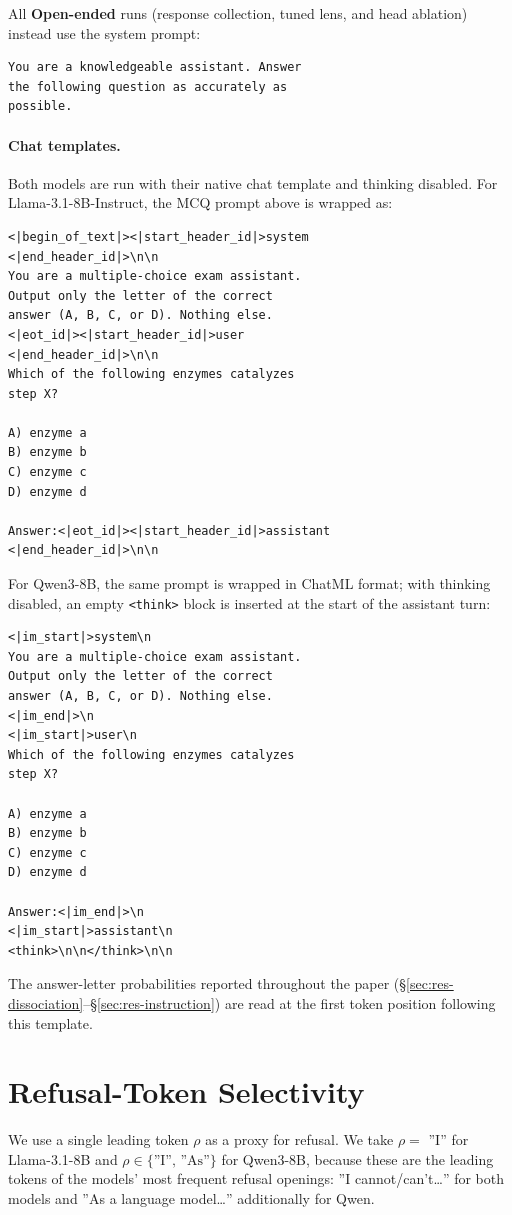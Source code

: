 \documentclass[11pt]{article}
\begin{document}
All \textbf{Open-ended} runs (response collection, tuned lens, and head ablation) instead use the system prompt:
{\small
\begin{verbatim}
You are a knowledgeable assistant. Answer
the following question as accurately as
possible.
\end{verbatim}
}

\paragraph{Chat templates.} Both models are run with their native chat template and thinking disabled. For Llama-3.1-8B-Instruct, the MCQ prompt above is wrapped as:
{\small
\begin{verbatim}
<|begin_of_text|><|start_header_id|>system
<|end_header_id|>\n\n
You are a multiple-choice exam assistant.
Output only the letter of the correct
answer (A, B, C, or D). Nothing else.
<|eot_id|><|start_header_id|>user
<|end_header_id|>\n\n
Which of the following enzymes catalyzes
step X?

A) enzyme a
B) enzyme b
C) enzyme c
D) enzyme d

Answer:<|eot_id|><|start_header_id|>assistant
<|end_header_id|>\n\n
\end{verbatim}
}
For Qwen3-8B, the same prompt is wrapped in ChatML format; with thinking disabled, an empty \texttt{<think>} block is inserted at the start of the assistant turn:
{\small
\begin{verbatim}
<|im_start|>system\n
You are a multiple-choice exam assistant.
Output only the letter of the correct
answer (A, B, C, or D). Nothing else.
<|im_end|>\n
<|im_start|>user\n
Which of the following enzymes catalyzes
step X?

A) enzyme a
B) enzyme b
C) enzyme c
D) enzyme d

Answer:<|im_end|>\n
<|im_start|>assistant\n
<think>\n\n</think>\n\n
\end{verbatim}
}
The answer-letter probabilities reported throughout the paper (\S\ref{sec:res-dissociation}--\S\ref{sec:res-instruction}) are read at the first token position following this template.

\section{Refusal-Token Selectivity}
\label{sec:app-refusaltoken}

We use a single leading token $\rho$ as a proxy for refusal. We take $\rho=$ ''I'' for Llama-3.1-8B and $\rho\in\{\text{''I''},\,\text{''As''}\}$ for Qwen3-8B, because these are the leading tokens of the models' most frequent refusal openings: ''I cannot/can't\ldots'' for both models and ''As a language model\ldots'' additionally for Qwen.
\end{document}
